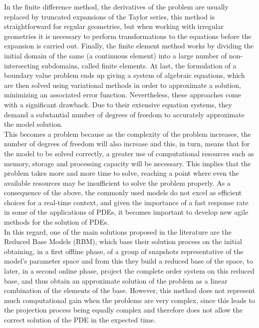\documentclass[12pt,letterpaper]{article}
\begin{document}
In the finite difference method, the derivatives of the problem are usually replaced by truncated expansions of the Taylor series, this method is straightforward for regular geometries, but when working with irregular geometries it is necessary to perform transformations to the equations before the expansion is carried out\cite{AutoDesk}. Finally, the finite element method works by dividing the initial domain of the same (a continuous element) into a large number of non-intersecting subdomains, called finite elements. At last, the formulation of a boundary value problem ends up giving a system of algebraic equations, which are then solved using variational methods in order to approximate a solution, minimizing an associated error function\cite{element}. Nevertheless, these approaches come with a significant drawback. Due to their extensive equation systems, they demand a substantial number of degrees of freedom to accurately approximate the model solution. \\

This becomes a problem because as the complexity of the problem increases, the number of degrees of freedom will also increase and this, in turn, means that for the model to be solved correctly, a greater use of computational resources such as memory, storage and processing capacity will be necessary. This implies that the problem takes more and more time to solve, reaching a point where even the available resources may be insufficient to solve the problem properly. As a consequence of the above, the commonly used models do not excel as efficient choices for a real-time context, and given the importance of a fast response rate in some of the applications of PDEs\cite{raissi2019physics}, it becomes important to develop new agile methods for the solution of PDEs.\\

In this regard, one of the main solutions proposed in the literature are the Reduced Base Models (RBM), which base their solution process on the initial obtaining, in a first offline phase, of a group of snapshots representative of the model's parameter space and from this they build a reduced base of the space, to later, in a second online phase, project the complete order system on this reduced base, and thus obtain an approximate solution of the problem as a linear combination of the elements of the base. However, this method does not represent much computational gain when the problems are very complex, since this leads to the projection process being equally complex and therefore does not allow the correct solution of the PDE in the expected time.
\end{document}
